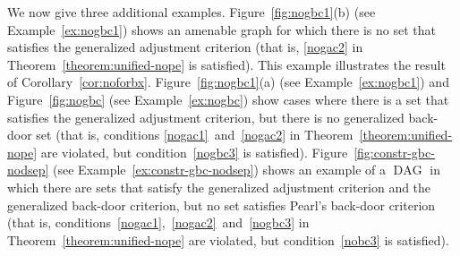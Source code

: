 \documentclass[11pt,a4paper]{article}
\DeclareMathOperator{\DAG}{DAG}
\begin{document}
We now give three additional examples. Figure~\ref{fig:nogbc1}(b) (see Example~\ref{ex:nogbc1}) shows an amenable graph for which there is no set that satisfies the generalized adjustment criterion (that is, \ref{nogac2} in Theorem~\ref{theorem:unified-nope} is satisfied). This example illustrates the result of Corollary~\ref{cor:noforbx}. Figure~\ref{fig:nogbc1}(a) (see Example~\ref{ex:nogbc1}) and Figure~\ref{fig:nogbc} (see Example~\ref{ex:nogbc}) show cases where there is a set that satisfies the generalized adjustment criterion, but there is no generalized back-door set (that is, conditions \ref{nogac1}~and~\ref{nogac2} in Theorem~\ref{theorem:unified-nope} are violated, but condition~\ref{nogbc3} is satisfied). Figure~\ref{fig:constr-gbc-nodsep} (see Example~\ref{ex:constr-gbc-nodsep}) shows an example of a $\DAG$ in which there are sets that satisfy the generalized adjustment criterion and the generalized back-door criterion, but no set satisfies Pearl's back-door criterion (that is, conditions~\ref{nogac1},~\ref{nogac2}~and~\ref{nogbc3} in Theorem~\ref{theorem:unified-nope} are violated, but condition~\ref{nobc3} is satisfied).
\end{document}
